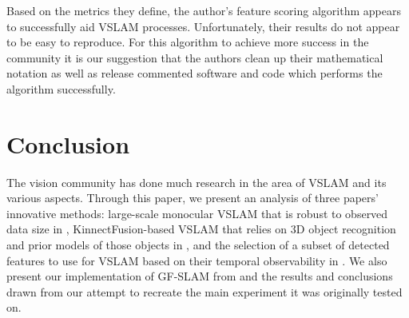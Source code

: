 \documentclass[10pt,twocolumn,letterpaper]{article}
\begin{document}
Based on the metrics they define, the author's feature scoring algorithm appears to successfully aid VSLAM processes. Unfortunately, their results do not appear to be easy to reproduce. For this algorithm to achieve more success in the community it is our suggestion that the authors clean up their mathematical notation as well as release commented software and code which performs the algorithm successfully.    

\section{Conclusion}
The vision community has done much research in the area of VSLAM and its various aspects. Through this paper, we present an analysis of three papers' innovative methods: large-scale monocular VSLAM that is robust to observed data size in \cite{Bourmaud_2015_CVPR}, KinnectFusion-based VSLAM that relies on 3D object recognition and prior models of those objects in \cite{Salas-Moreno_2013_CVPR}, and the selection of a subset of detected features to use for VSLAM based on their temporal observability in \cite{Zhang_2015_CVPR}. We also present our implementation of GF-SLAM from \cite{Zhang_2015_CVPR} and the results and conclusions drawn from our attempt to recreate the main experiment it was originally tested on. 

{\small


}
\end{document}
